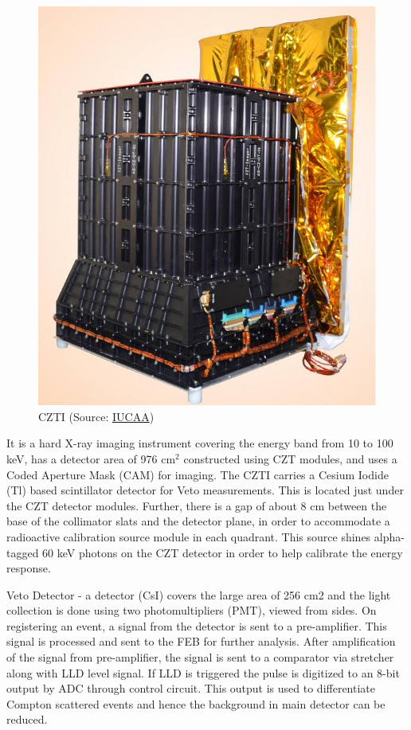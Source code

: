 \documentclass[11pt]{book} %
\begin{document}
\begin{figure}
    \centering
    \includegraphics[scale=1]{Pictures/czti.jpg}
\caption{CZTI (Source: \href{http://astrosat.iucaa.in/czti/?q=home}{IUCAA})}
\end{figure}

It is a hard X-ray imaging instrument covering the energy band from 10 to 100 keV, has a detector area of 976 cm$^2$ constructed using CZT modules, and uses a Coded Aperture Mask (CAM) for imaging.
The CZTI carries a Cesium Iodide (Tl) based scintillator detector for Veto measurements. This is located just under the CZT detector modules. Further, there is a gap of about 8 cm between the base of the collimator slats and the detector plane, in order to accommodate a radioactive calibration source module in each quadrant. This source shines alpha-tagged 60 keV photons on the CZT detector in order to help calibrate the energy response.

Veto Detector - a detector (CsI) covers the large area of 256 cm2 and the light collection is done using two photomultipliers (PMT), viewed from sides. On registering an event, a signal from the detector is sent to a pre-amplifier. This signal is processed and sent to the FEB for further analysis. After amplification of the signal from pre-amplifier, the signal is sent to a comparator via stretcher along with LLD level signal. If LLD is triggered the pulse is digitized to an 8-bit output by ADC through control circuit. This output is used to differentiate Compton scattered events and hence the background in main detector can be reduced.
\end{document}
